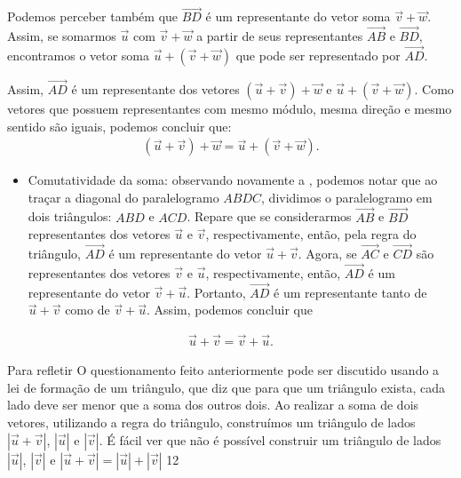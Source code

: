 Podemos perceber também que \(\overrightarrow{BD}\) é um representante do vetor soma \(\vec{v} + \vec{w}\). Assim, se somarmos \(\vec{u}\) com \(\vec{v} + \vec{w}\) a partir de seus representantes \(\overrightarrow{AB}\)  e \(\overrightarrow{BD}\), encontramos o vetor soma \(\vec{u} + (\vec{v}+\vec{w})\) que pode ser representado por \(\overrightarrow{AD}\).

Assim, \(\overrightarrow{AD}\) é um representante dos vetores \((\vec{u} + \vec{v})+\vec{w}\) e \(\vec{u} + (\vec{v}+\vec{w})\). Como vetores que possuem representantes com mesmo módulo, mesma direção e mesmo sentido são iguais, podemos concluir que:
\begin{equation*}
\begin{split}(\vec{u} + \vec{v}) + \vec{w} = \vec{u} + (\vec{v} + \vec{w}).\end{split}
\end{equation*}\begin{itemize}
\item {} 
Comutatividade da soma: observando novamente a , podemos notar que ao traçar a diagonal do paralelogramo \(ABDC\), dividimos o paralelogramo em dois triângulos: \(ABD\) e \(ACD\). Repare que se considerarmos \(\overrightarrow{AB}\) e \(\overrightarrow{BD}\) representantes dos vetores \(\vec{u}\) e \(\vec{v}\), respectivamente, então, pela regra do triângulo, \(\overrightarrow{AD}\) é um representante do vetor \(\vec{u}+\vec{v}\). Agora, se \(\overrightarrow{AC}\) e \(\overrightarrow{CD}\) são representantes dos vetores \(\vec{v}\) e \(\vec{u}\), respectivamente, então, \(\overrightarrow{AD}\) é um representante do vetor \(\vec{v}+\vec{u}\). Portanto, \(\overrightarrow{AD}\) é um representante tanto de \(\vec{u}+\vec{v}\) como de \(\vec{v}+\vec{u}\). Assim, podemos concluir que

\end{itemize}
\begin{equation*}
\begin{split}\vec{u} + \vec{v} = \vec{v} + \vec{u}.\end{split}
\end{equation*}

\clearpage
\begin{objectives}{Para refletir}
{O questionamento feito anteriormente pode ser discutido usando a lei de formação de um triângulo, que diz que para que um triângulo exista, cada lado deve ser menor que a soma dos outros dois. Ao realizar a soma de dois vetores, utilizando a regra do triângulo, construímos um triângulo de lados \(|\vec{u}+\vec{v}|\), \(|\vec{u}|\) e  \(|\vec{v}|\). É fácil ver que não é possível construir um triângulo de lados  \(|\vec{u}|\), \(|\vec{v}|\) e \(|\vec{u}+\vec{v}|=|\vec{u}|+|\vec{v}|\)}
{1}{2}
\end{objectives}

